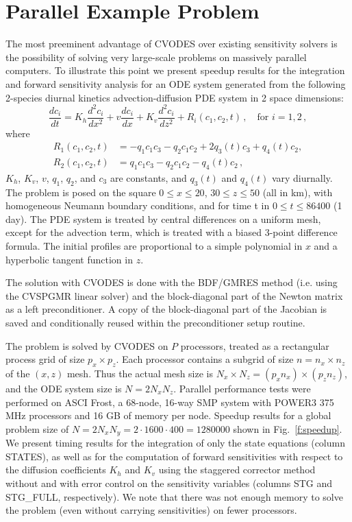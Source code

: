 \section{Parallel  Example Problem}\label{s:parallel}

The most preeminent advantage of CVODES over existing sensitivity solvers is
the possibility of solving very large-scale problems on massively parallel 
computers. To illustrate this point we present speedup results for the 
integration and forward sensitivity analysis for
an ODE system generated from the following 2-species diurnal
kinetics advection-diffusion PDE system in 2 space dimensions: 
\begin{equation}
  \frac{dc_i}{dt} = K_h \frac{d^2c_i}{dx^2} + v \frac{dc_i}{dx} 
  + K_v \frac{d^2c_i}{dz^2}
  + R_i(c_1, c_2, t) \, , \quad \text{for } i=1,2 \, ,
\end{equation}
where
\begin{equation}
  \begin{split}
    R_1(c_1,c_2,t) &= -q_1 c_1 c_3 - q_2 c_1 c_2 + 2 q_3(t) c_3 + q_4(t) c_2 , \\
    R_2(c_1,c_2,t) &=  q_1 c_1 c_3 - q_2 c_1 c_2 - q_4(t) c_2 \, ,
  \end{split}
\end{equation}
$K_h$, $K_v$, $v$, $q_1$, $q_2$, and $c_3$ are constants, and $q_3(t)$ and $q_4(t)$
vary diurnally.   
The problem is posed on the square
$0 \le x \le 20$, $30 \le z \le 50$   (all in km),
with homogeneous Neumann boundary conditions, and for time t in
$0 \le t \le 86400$ (1 day).
The PDE system is treated by central differences on a uniform
mesh, except for the advection term, which is treated with a biased
3-point difference formula.
The initial profiles are proportional to a simple polynomial in $x$
and a hyperbolic tangent function in $z$.

The solution with CVODES is done with the BDF/GMRES method (i.e.
using the CVSPGMR linear solver) and the block-diagonal part of the 
Newton matrix as a left preconditioner. A copy of the block-diagonal
part of the Jacobian is saved and conditionally reused within the
preconditioner setup routine.

The problem is solved by CVODES on $P$ processors, treated as a 
rectangular process grid of size $p_x \times p_z$.
Each processor contains a subgrid of size $n = n_x \times n_z$ of the 
$(x,z)$ mesh.  Thus the actual mesh size is 
$N_x \times N_z = (p_x n_x) \times (p_z n_z)$,
and the ODE system size is $N = 2 N_x N_z$.
Parallel performance tests were performed on ASCI Frost, a 68-node, 16-way SMP system
with POWER3 375 MHz processors and 16 GB of memory per node.
Speedup results for a global problem size of
$N = 2 N_x N_y = 2 \cdot 1600 \cdot 400 = 1280000$ 
shown in Fig.~\ref{f:speedup}.
We present timing results for the integration of only the state equations
(column STATES), as well as for
the computation of forward sensitivities with respect to the diffusion coefficients
$K_h$ and $K_v$ using the staggered corrector method without and with 
error control on the sensitivity variables (columns STG and
STG\_FULL, respectively). 
We note that there was not enough memory to solve the problem (even without
carrying sensitivities) on fewer processors.

